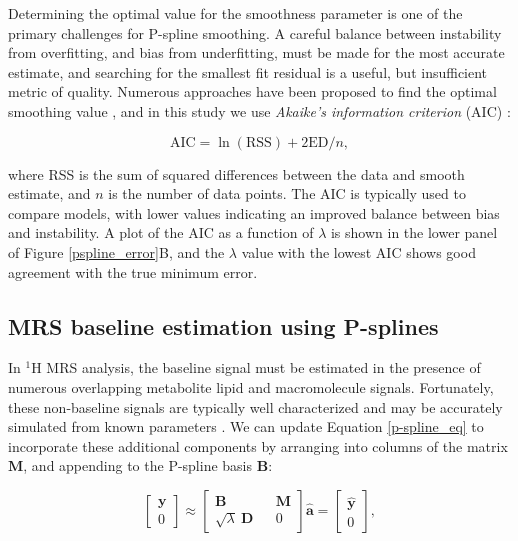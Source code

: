 \documentclass[num-refs]{wiley-article}
\begin{document}
Determining the optimal value for the smoothness parameter is one of the primary challenges for P-spline smoothing. A careful balance between instability from overfitting, and bias from underfitting, must be made for the most accurate estimate, and searching for the smallest fit residual is a useful, but insufficient metric of quality. Numerous approaches have been proposed to find the optimal smoothing value \cite{Ruppert2003}, and in this study we use \textit{Akaike's information criterion} (AIC) \cite{Akaike1973}:


\begin{equation}
  \textrm{AIC} = \ln(\textrm{RSS}) + 2 \textrm{ED} / n,
\end{equation}

where RSS is the sum of squared differences between the data and smooth estimate, and $n$ is the number of data points. The AIC is typically used to compare models, with lower values indicating an improved balance between bias and instability. A plot of the AIC as a function of $\lambda$ is shown in the lower panel of Figure \ref{pspline_error}B, and the $\lambda$ value with the lowest AIC shows good agreement with the true minimum error.

\subsection{MRS baseline estimation using P-splines}

In $^1\mathrm{H}$ MRS analysis, the baseline signal must be estimated in the presence of numerous overlapping metabolite lipid and macromolecule signals. Fortunately, these non-baseline signals are typically well characterized and may be accurately simulated from known parameters \cite{Govind2015}. We can update Equation \ref{p-spline_eq} to incorporate these additional components by arranging into columns of the matrix $\mathbf{M}$, and appending to the P-spline basis $\mathbf{B}$:

\begin{equation}
  \begin{bmatrix}
    \textbf{y} \\ 0
  \end{bmatrix}
  \approx
  \begin{bmatrix}
    \textbf{B} && \textbf{M} \\ \sqrt{\lambda} \ \textbf{D} && 0
  \end{bmatrix} \hat{\mathbf{a}} =
  \begin{bmatrix}
    \hat{\textbf{y}} \\ 0
  \end{bmatrix},
\end{equation}
\end{document}
